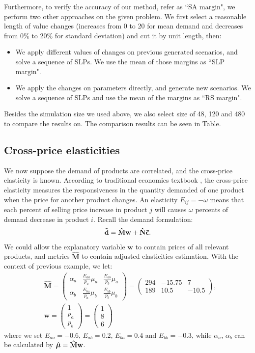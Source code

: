 \documentclass[a4paper,11pt]{article}
\begin{document}
Furthermore, to verify the accuracy of our method, refer as ``SA margin",  we perform two other approaches on the given problem. We first select a reasonable length of value changes (increases from 0 to 20 for mean demand and decreases from 0\% to 20\% for standard deviation) and cut it by unit length, then:
\begin{itemize}
    \item We
    apply different values of changes on previous generated scenarios, and solve a sequence of SLPs. We use the mean of those margins as ``SLP margin".
    \item We apply the changes on parameters directly, and generate new scenarios. We solve a sequence of SLPs and use the mean of the margins as ``RS margin".
\end{itemize}
Besides the simulation size we used above, we also select size of 48, 120 and 480 to compare the results on.
The comparison results can be seen in Table.

\subsection{Cross-price elasticities} \label{sub:app2}

We now suppose the demand of products are correlated, and the cross-price elasticity is known. According to traditional economics textbook \cite{FC13}, the cross-price elasticity measures the responsiveness in the quantity demanded of one product when the price for another product changes. An elasticity $E_{ij} = -\omega$ means that each percent of selling price increase in product $j$ will causes $\omega$ percents of demand decrease in product $i$. Recall the demand formulation:
\[
\mathbf{\tilde{d}} =  \mathbf{\hat{M}} \mathbf{w}
+ \mathbf{\hat{N}} \mbox{\boldmath$\tilde{\epsilon}$}.
\]
We could allow the explanatory variable $\mathbf{w}$ to contain prices of all relevant products, and metrics $\mathbf{\hat{M}}$ to contain adjusted elasticities estimation. With the context of previous example, we let:
\[
\begin{aligned}
&\mathbf{\hat{M}} = 
\begin{pmatrix}
\alpha_a&\frac{E_{aa}}{p_a}\mu_a&\frac{E_{ab}}{p_b}\mu_a\\
\alpha_b&\frac{E_{ba}}{p_a}\mu_b&\frac{E_{bb}}{p_b}\mu_b
\end{pmatrix} =
\begin{pmatrix}
294&-15.75&7\\
189&10.5&-10.5
\end{pmatrix},\\
&\mathbf{w} = 
\begin{pmatrix}
1\\
p_a\\
p_b
\end{pmatrix} =
\begin{pmatrix}
1\\
8\\
6
\end{pmatrix}
\end{aligned}
\]
where we set $E_{aa} = -0.6$, $E_{ab} = 0.2$, $E_{ba} = 0.4$ and $E_{bb} = -0.3$, while $\alpha_a$, $\alpha_b$ can be calculated by $\mbox{\boldmath$\hat{\mu}$} = \mathbf{\hat{M}}\mathbf{w}$.
\end{document}
